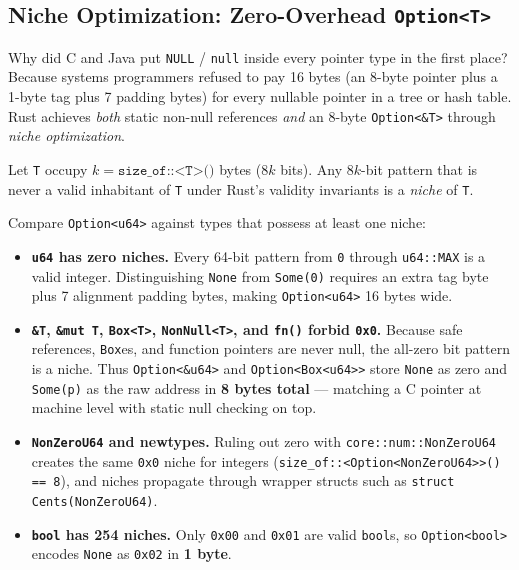 \subsection{Niche Optimization: Zero-Overhead \texttt{Option<T>}}
\label{ch05:niche}

Why did C and Java put \texttt{NULL} / \texttt{null} inside every pointer type in the first place? Because systems programmers refused to pay 16 bytes (an 8-byte pointer plus a 1-byte tag plus 7 padding bytes) for every nullable pointer in a tree or hash table. Rust achieves \emph{both} static non-null references \emph{and} an 8-byte \texttt{Option<\&T>} through \emph{niche optimization}.

\begin{definition}
\label{ch05:def-niche}
Let \texttt{T} occupy $k = \texttt{size\_of::<T>()}$ bytes ($8k$ bits). Any $8k$-bit pattern that is never a valid inhabitant of \texttt{T} under Rust's validity invariants is a \emph{niche} of \texttt{T}.
\end{definition}

Compare \texttt{Option<u64>} against types that possess at least one niche:
\begin{itemize}
  \item \textbf{\texttt{u64} has zero niches.} Every 64-bit pattern from \texttt{0} through \texttt{u64::MAX} is a valid integer. Distinguishing \texttt{None} from \texttt{Some(0)} requires an extra tag byte plus 7 alignment padding bytes, making \texttt{Option<u64>} 16 bytes wide.
  \item \textbf{\texttt{\&T}, \texttt{\&mut T}, \texttt{Box<T>}, \texttt{NonNull<T>}, and \texttt{fn()} forbid \texttt{0x0}.} Because safe references, \texttt{Box}es, and function pointers are never null, the all-zero bit pattern is a niche. Thus \texttt{Option<\&u64>} and \texttt{Option<Box<u64>>} store \texttt{None} as zero and \texttt{Some(p)} as the raw address in \textbf{8 bytes total} --- matching a C pointer at machine level with static null checking on top.
  \item \textbf{\texttt{NonZeroU64} and newtypes.} Ruling out zero with \texttt{core::num::NonZeroU64} creates the same \texttt{0x0} niche for integers (\texttt{size\_of::<Option<NonZeroU64>>() == 8}), and niches propagate through wrapper structs such as \texttt{struct Cents(NonZeroU64)}.
  \item \textbf{\texttt{bool} has 254 niches.} Only \texttt{0x00} and \texttt{0x01} are valid \texttt{bool}s, so \texttt{Option<bool>} encodes \texttt{None} as \texttt{0x02} in \textbf{1 byte}.
\end{itemize}

